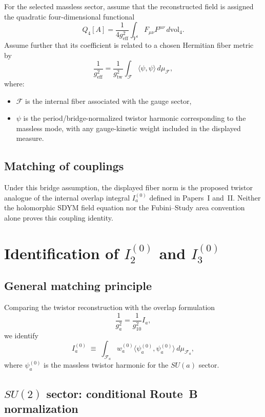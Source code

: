 \documentclass[11pt]{article}
\begin{document}
\begin{assumption}
For the selected massless sector, assume that the reconstructed field is
assigned the quadratic four-dimensional functional
\[
Q_4[A] = \frac{1}{4g_{\mathrm{eff}}^2}
\int_{Y^4} F_{\mu\nu}F^{\mu\nu}\,d\mathrm{vol}_4.
\]
Assume further that its coefficient is related to a chosen Hermitian fiber
metric by
\[
\frac{1}{g_{\mathrm{eff}}^2}
=
\frac{1}{g_{\mathrm{tw}}^2}
\int_{\mathcal F} \langle \psi, \psi\rangle\,d\mu_{\mathcal F},
\]
where:
\begin{itemize}
\item $\mathcal F$ is the internal fiber associated with the gauge sector,
\item $\psi$ is the period/bridge-normalized twistor harmonic corresponding to
the massless mode, with any gauge-kinetic weight included in the displayed
measure.
\end{itemize}
\end{assumption}

\subsection{Matching of couplings}

Under this bridge assumption, the displayed fiber norm is the proposed
twistor analogue of the internal overlap integral $I_a^{(0)}$ defined in
Papers~I and~II. Neither the holomorphic SDYM field equation nor the
Fubini--Study area convention alone proves this coupling identity.

\section{Identification of
\texorpdfstring{$I_2^{(0)}$ and $I_3^{(0)}$}{I2(0) and I3(0)}}

\subsection{General matching principle}

Comparing the twistor reconstruction with the overlap formulation
\[
\frac{1}{g_a^2} = \frac{1}{g_{10}^2} I_a,
\]
we identify
\[
I_a^{(0)} \;\equiv\;
\int_{\mathcal F_a}
w_a^{(0)}\langle \psi_a^{(0)}, \psi_a^{(0)}\rangle\,
d\mu_{\mathcal F_a},
\]
where $\psi_a^{(0)}$ is the massless twistor harmonic for the $SU(a)$ sector.

\subsection{\texorpdfstring{$SU(2)$}{SU(2)} sector:
conditional Route~B normalization}
\end{document}
